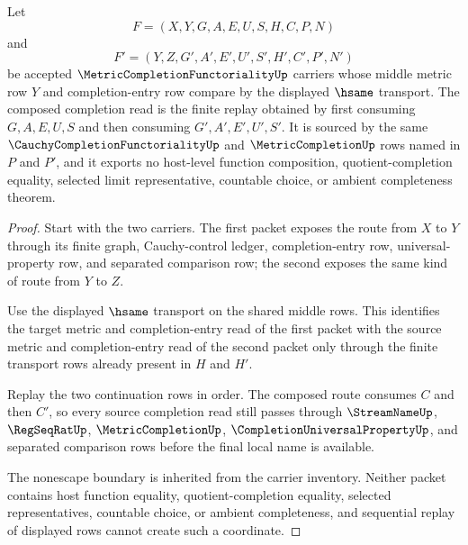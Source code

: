 \begin{theorem}
\label{thm:metric-completion-functoriality-composition}
Let
$$
F=(X,Y,G,A,E,U,S,H,C,P,N)
$$
and
$$
F'=(Y,Z,G',A',E',U',S',H',C',P',N')
$$
be accepted $\MetricCompletionFunctorialityUp$ carriers whose middle metric row $Y$ and completion-entry row compare by the displayed $\hsame$ transport. The composed completion read is the finite replay obtained by first consuming $G,A,E,U,S$ and then consuming $G',A',E',U',S'$. It is sourced by the same $\CauchyCompletionFunctorialityUp$ and $\MetricCompletionUp$ rows named in $P$ and $P'$, and it exports no host-level function composition, quotient-completion equality, selected limit representative, countable choice, or ambient completeness theorem.
\end{theorem}
\begin{proof}
Start with the two carriers. The first packet exposes the route from $X$ to $Y$ through its finite graph, Cauchy-control ledger, completion-entry row, universal-property row, and separated comparison row; the second exposes the same kind of route from $Y$ to $Z$.

Use the displayed $\hsame$ transport on the shared middle rows. This identifies the target metric and completion-entry read of the first packet with the source metric and completion-entry read of the second packet only through the finite transport rows already present in $H$ and $H'$.

Replay the two continuation rows in order. The composed route consumes $C$ and then $C'$, so every source completion read still passes through $\StreamNameUp$, $\RegSeqRatUp$, $\MetricCompletionUp$, $\CompletionUniversalPropertyUp$, and separated comparison rows before the final local name is available.

The nonescape boundary is inherited from the carrier inventory. Neither packet contains host function equality, quotient-completion equality, selected representatives, countable choice, or ambient completeness, and sequential replay of displayed rows cannot create such a coordinate.
\end{proof}


